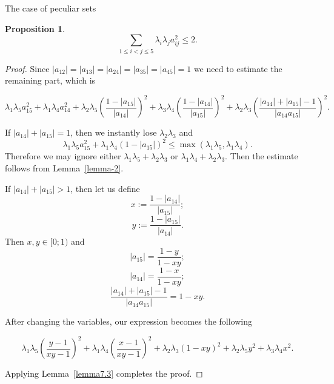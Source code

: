\documentclass[12pt]{article}
\newtheorem{proposition}{Proposition}[section]
\begin{document}
\begin{section}{The case of peculiar sets}
\begin{proposition}
        $$
             \sum_{1\leq i<j\leq 5}\lambda_{i}\lambda_{j}a_{ij}^2 \leq 2.
        $$
    \end{proposition}
    
    \begin{proof}
        Since $|a_{12}|=|a_{13}|=|a_{24}|=|a_{35}|=|a_{45}|=1$ we need to estimate the remaining part, which is 

         $$
            \lambda_{1}\lambda_{5}a_{15}^2 + \lambda_{1}\lambda_{4} a_{14}^2 + \lambda_{2}\lambda_{5}\left(\frac{1-|a_{15}|}{|a_{14}|}\right)^2 + \lambda_{3}\lambda_{4}\left(\frac{1-|a_{14}|}{|a_{15}|}\right)^2 + \lambda_{2}\lambda_{3}\left(\frac{|a_{14}|+|a_{15}| - 1}{|a_{14}a_{15}|}\right)^2 .
        $$
        
    If $|a_{14}| + |a_{15}| = 1$, then we instantly lose $\lambda_{2}\lambda_{3}$ and 
       $$
            \lambda_{1}\lambda_{5}a_{15}^2 + \lambda_{1}\lambda_{4}(1-|a_{15}|)^2 \leq \max (\lambda_{1}\lambda_{5},\lambda_{1}\lambda_{4}).
       $$
    Therefore we may ignore  either $\lambda_{1}\lambda_{5} + \lambda_{2}\lambda_{3}$ or $\lambda_{1}\lambda_{4} + \lambda_{2}\lambda_{3}$. Then the estimate follows from Lemma~\ref{lemma-2}.
    
        
        If $|a_{14}| + |a_{15}| > 1$, then let us define 
        $$
            x:=\frac{1-|a_{14}|}{|a_{15}|};
        $$
        $$         y:=\frac{1-|a_{15}|}{|a_{14}|}.
        $$
        Then $x,y\in [0;1)$ and 
        $$
            |a_{15}| = \frac{1-y}{1-xy};
        $$
         $$
            |a_{14}| = \frac{1-x}{1-xy};
        $$
        $$
            \frac{|a_{14}|+|a_{15}| - 1}{|a_{14}a_{15}|} = 1-xy.
        $$

        After changing the variables, our expression becomes the following

        $$      \lambda_{1}\lambda_{5}\left(\frac{y-1}{xy-1}\right)^2 + \lambda_{1}\lambda_{4} \left(\frac{x-1}{xy-1}\right)^2 + \lambda_{2}\lambda_{3}(1-xy)^2 + \lambda_{2}\lambda_{5}y^{2} + \lambda_{3}\lambda_{4}x^{2} .
        $$ 

        Applying Lemma~\ref{lemma7.3} completes the proof.
        
           
    \end{proof}

\end{section}
\end{document}
